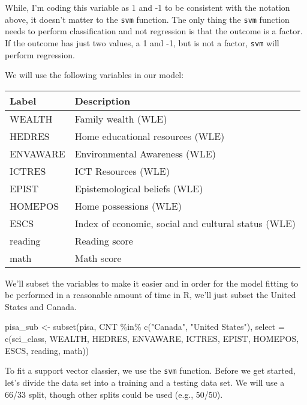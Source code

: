 \documentclass[
]{book}
\newenvironment{Shaded}{\begin{snugshade}}{\end{snugshade}}
\newcommand{\AttributeTok}[1]{\textcolor[rgb]{0.77,0.63,0.00}{#1}}
\newcommand{\FunctionTok}[1]{\textcolor[rgb]{0.00,0.00,0.00}{#1}}
\newcommand{\NormalTok}[1]{#1}
\newcommand{\OtherTok}[1]{\textcolor[rgb]{0.56,0.35,0.01}{#1}}
\newcommand{\SpecialCharTok}[1]{\textcolor[rgb]{0.00,0.00,0.00}{#1}}
\newcommand{\StringTok}[1]{\textcolor[rgb]{0.31,0.60,0.02}{#1}}
\begin{document}
While, I'm coding this variable as 1 and -1 to be consistent with the notation above, it doesn't matter to the \texttt{svm} function. The only thing the \texttt{svm} function needs to perform classification and not regression is that the outcome is a factor. If the outcome has just two values, a 1 and -1, but is not a factor, \texttt{svm} will perform regression.

We will use the following variables in our model:

\begin{longtable}[]{@{}ll@{}}
\toprule
Label & Description\tabularnewline
\midrule
\endhead
WEALTH & Family wealth (WLE)\tabularnewline
HEDRES & Home educational resources (WLE)\tabularnewline
ENVAWARE & Environmental Awareness (WLE)\tabularnewline
ICTRES & ICT Resources (WLE)\tabularnewline
EPIST & Epistemological beliefs (WLE)\tabularnewline
HOMEPOS & Home possessions (WLE)\tabularnewline
ESCS & Index of economic, social and cultural status (WLE)\tabularnewline
reading & Reading score\tabularnewline
math & Math score\tabularnewline
\bottomrule
\end{longtable}

We'll subset the variables to make it easier and in order for the model fitting to be performed in a reasonable amount of time in R, we'll just subset the United States and Canada.

\begin{Shaded}
\begin{Highlighting}[]
\NormalTok{pisa\_sub }\OtherTok{\textless{}{-}} \FunctionTok{subset}\NormalTok{(pisa, CNT }\SpecialCharTok{\%in\%} \FunctionTok{c}\NormalTok{(}\StringTok{"Canada"}\NormalTok{, }\StringTok{"United States"}\NormalTok{), }\AttributeTok{select =} \FunctionTok{c}\NormalTok{(sci\_class, WEALTH, HEDRES, ENVAWARE, ICTRES, EPIST, HOMEPOS, ESCS, reading, math))}
\end{Highlighting}
\end{Shaded}

To fit a support vector classier, we use the \texttt{svm} function. Before we get started, let's divide the data set into a training and a testing data set. We will use a 66/33 split, though other splits could be used (e.g., 50/50).
\end{document}
